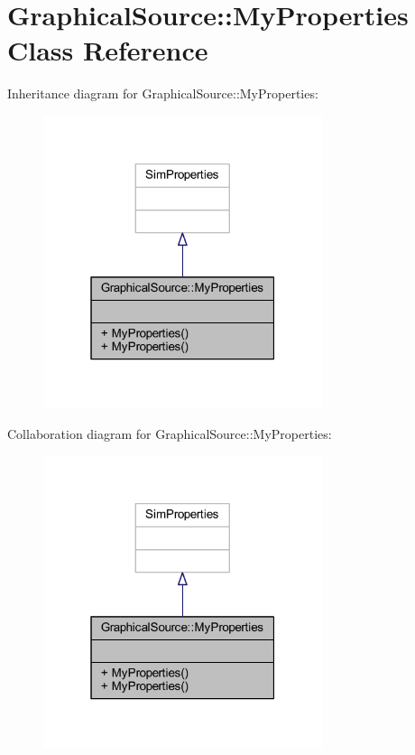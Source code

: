 \hypertarget{class_graphical_source_1_1_my_properties}{}\section{Graphical\+Source\+:\+:My\+Properties Class Reference}
\label{class_graphical_source_1_1_my_properties}


Inheritance diagram for Graphical\+Source\+:\+:My\+Properties\+:
\nopagebreak
\begin{figure}[H]
\begin{center}
\leavevmode
\includegraphics[width=232pt]{class_graphical_source_1_1_my_properties__inherit__graph}
\end{center}
\end{figure}


Collaboration diagram for Graphical\+Source\+:\+:My\+Properties\+:
\nopagebreak
\begin{figure}[H]
\begin{center}
\leavevmode
\includegraphics[width=232pt]{class_graphical_source_1_1_my_properties__coll__graph}
\end{center}
\end{figure}
